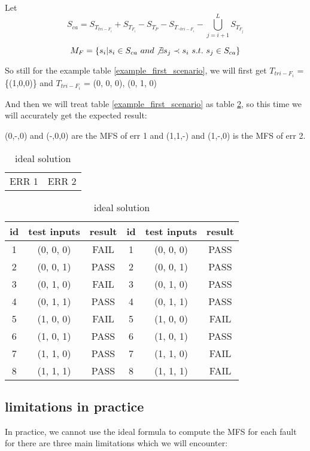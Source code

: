 \documentclass{sig-alternate}
\begin{document}
Let $$S_{ca} = S_{T_{tri-F_{i}}} + S_{T_{F_{i}}} - S_{T_{P}} -  S_{T_{\neg tri-F_{i}}} - \bigcup_{j = i+1}^{L}S_{T_{F_{j}}} $$

$$M_{F} = \{s_{i} | s_{i} \in S_{ca}\ and \not\exists s_{j} \prec s_{i}\ s.t.\ s_{j} \in S_{ca} \}$$

So still for the example table \ref{example_first_scenario}, we will first get
$ T_{tri-F_{i}}$ = \{(1,0,0)\} and $ T_{tri-F_{i}}$ = { (0, 0, 0), (0, 1, 0)}

And then we will treat table \ref{example_first_scenario} as table \ref{ideal_solution}, so this time we will accurately get the expected result:

(0,-,0) and (-,0,0) are the MFS of err 1 and (1,1,-) and (1,-,0) is the MFS of err 2.

\begin{table}
\centering
\caption{ideal solution}
\label{ideal_solution}
\begin{tabular}{p{}|p{}} \hline
   ERR 1 & ERR 2
\end{tabular}

\begin{tabular}{c|c|c|c|c|c} \hline
id &test inputs & result & id&test inputs & result\\ \hline
1 &(0, 0, 0) &  FAIL &1&(0, 0, 0) &  PASS\\ \hline
2 &(0, 0, 1) &  PASS &2&(0, 0, 1) &  PASS\\ \hline
3 &(0, 1, 0) &  FAIL &3&(0, 1, 0) &  PASS\\ \hline
4 &(0, 1, 1) &  PASS &4&(0, 1, 1) &  PASS\\ \hline
5 &(1, 0, 0) &  FAIL &5&(1, 0, 0) &  FAIL\\ \hline
6 &(1, 0, 1) &  PASS &6&(1, 0, 1) &  PASS\\ \hline
7 &(1, 1, 0) &  PASS &7&(1, 1, 0) &  FAIL\\ \hline
8 &(1, 1, 1) &  PASS &8&(1, 1, 1) &  FAIL\\ \hline
\hline\end{tabular}
\end{table}


\subsection{limitations in practice}
In practice, we cannot use the ideal formula to compute the MFS for each fault for there are three main limitations which we will encounter:
\end{document}
